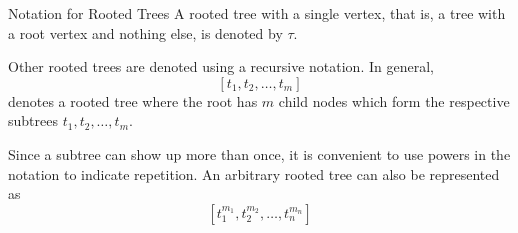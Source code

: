 \documentclass{beamer}
\begin{document}
\begin{frame}{Notation for Rooted Trees}
  A rooted tree with a single vertex, that is, a tree with a root vertex and nothing else, is denoted by $\tau$.
  \begin{center}
  \end{center}
  Other rooted trees are denoted using a recursive notation. In general,
  $$\left[ t_1, t_2, \dots, t_m \right]$$
  denotes a rooted tree where the root has $m$ child nodes which form the respective subtrees $t_1, t_2, \dots, t_m$. 
  \newline
  
  Since a subtree can show up more than once, it is convenient to use powers in the notation to indicate repetition. 
  An arbitrary rooted tree can also be represented as
  $$\left[ t^{m_1}_1, t^{m_2}_2, \dots, t^{m_n}_n \right]$$
\end{frame}
\end{document}
